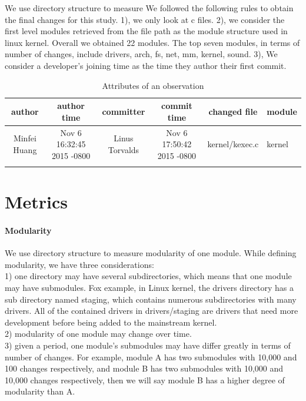 \documentclass{sig-alternate-05-2015}
\begin{document}
We use directory structure to measure 
We followed the following rules to obtain the final changes for this study.
1), we only look at c files.
2), we consider the first level modules retrieved from the file path 
as the module structure used in linux kernel. Overall we obtained 22 modules.
The top seven modules, in terms of number of changes, include drivers, arch, fs, net, mm, kernel, sound.
3), We consider a developer's joining time as the time they author their first commit.

\begin{table}
\centering
\caption{Attributes of an observation}
\begin{tabular}{c|c|c|c|c|l} \hline
author & author time & committer & commit time & changed file & module\\ \hline
 Minfei Huang & Nov 6 16:32:45 2015 -0800 & Linus Torvalds & Nov 6 17:50:42 2015 -0800 & kernel/kexec.c &kernel\\ \hline
\label{tab:data}
\end{tabular}
\end{table}


\section{Metrics}
\paragraph{Modularity}
We use directory structure to measure modularity of one module. While defining modularity, we have three considerations: \\

1) one directory may have several subdirectories, which means that one module may have submodules. Fox example, in Linux kernel, the drivers directory has a sub directory named staging, 
which contains numerous subdirectories with many drivers. All of the contained drivers in drivers/staging are drivers that need more development before being added to the mainstream kernel.\\
2) modularity of one module may change over time.\\
3) given a period, one module's submodules may have differ greatly in terms of number of changes. For example, module A has two submodules with 10,000 and 100 changes respectively, and module B has two submodules with 10,000 and 10,000 changes respectively, then we will say module B has a higher degree of modularity than A.
\end{document}
